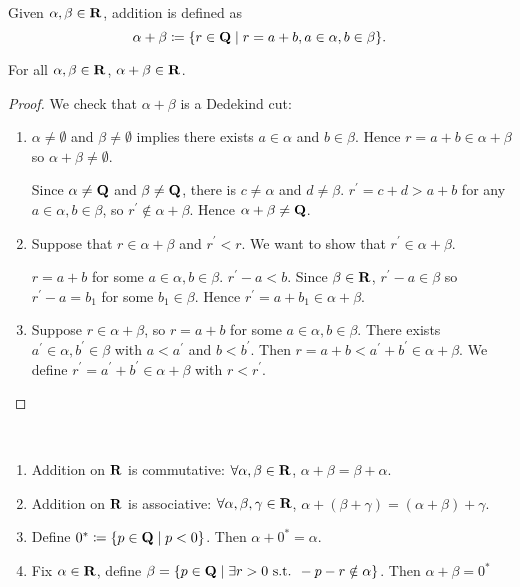 \begin{definition*}[Addition]
Given $\alpha,\beta\in\mathbf R$, addition is defined as
\[\alpha+\beta\coloneqq\{r\in\mathbf Q\mid r=a+b,a\in\alpha,b\in\beta\}.\]
\end{definition*}

\begin{proposition*}
For all $\alpha,\beta\in\mathbf R$, $\alpha+\beta\in\mathbf R$.
\end{proposition*}

\begin{proof}
We check that $\alpha+\beta$ is a Dedekind cut:
\begin{enumerate}[label=(\roman*)]
\item $\alpha\neq\emptyset$ and $\beta\neq\emptyset$ implies there exists $a\in\alpha$ and $b\in\beta$. Hence $r=a+b\in\alpha+\beta$ so $\alpha+\beta\neq\emptyset$.

Since $\alpha\neq\mathbf Q$ and $\beta\neq\mathbf Q$, there is $c\neq\alpha$ and $d\neq\beta$. $r^\prime=c+d>a+b$ for any $a\in\alpha,b\in\beta$, so $r^\prime\notin\alpha+\beta$. Hence $\alpha+\beta\neq\mathbf Q$.

\item Suppose that $r\in\alpha+\beta$ and $r^\prime<r$. We want to show that $r^\prime\in\alpha+\beta$.

$r=a+b$ for some $a\in\alpha,b\in\beta$. $r^\prime-a<b$. Since $\beta\in\mathbf R$, $r^\prime-a\in\beta$ so $r^\prime-a=b_1$ for some $b_1\in\beta$. Hence $r^\prime=a+b_1\in\alpha+\beta$.

\item Suppose $r\in\alpha+\beta$, so $r=a+b$ for some $a\in\alpha,b\in\beta$. There exists $a^\prime\in\alpha,b^\prime\in\beta$ with $a<a^\prime$ and $b<b^\prime$. Then $r=a+b<a^\prime+b^\prime\in\alpha+\beta$. We define $r^\prime=a^\prime+b^\prime\in\alpha+\beta$ with $r<r^\prime$.
\end{enumerate}
\end{proof}

\begin{proposition*} \
\begin{enumerate}[label=(\arabic*)]
\item Addition on $\mathbf R$ is commutative:
$\forall\alpha,\beta\in\mathbf R$, $\alpha+\beta=\beta+\alpha$.
\item Addition on $\mathbf R$ is associative:
$\forall\alpha,\beta,\gamma\in\mathbf R$, $\alpha+(\beta+\gamma)=(\alpha+\beta)+\gamma$.
\item Define $0^*\coloneqq\{p\in\mathbf Q\mid p<0\}$. Then $\alpha+0^*=\alpha$.
\item Fix $\alpha\in\mathbf R$, define $\beta=\{p\in\mathbf Q\mid\exists r>0\text{ s.t. }-p-r\notin\alpha\}$. Then $\alpha+\beta=0^*$
\end{enumerate}
\end{proposition*}

